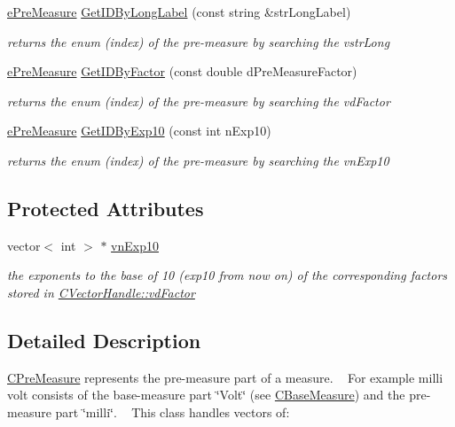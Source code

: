 \begin{DoxyCompactItemize}
\hyperlink{PreMeasure_8h_a6c81167b8d4c2badde42f81cb7214620}{e\+Pre\+Measure} \hyperlink{classCPreMeasure_a5c47dca5a6bc34def68e6a2c7b4c5caa}{Get\+I\+D\+By\+Long\+Label} (const string \&str\+Long\+Label)
\begin{DoxyCompactList}\small\item\em returns the enum (index) of the pre-\/measure by searching the vstr\+Long \end{DoxyCompactList}\item 
\hyperlink{PreMeasure_8h_a6c81167b8d4c2badde42f81cb7214620}{e\+Pre\+Measure} \hyperlink{classCPreMeasure_a90984e3bfb9676fca033289504d10219}{Get\+I\+D\+By\+Factor} (const double d\+Pre\+Measure\+Factor)
\begin{DoxyCompactList}\small\item\em returns the enum (index) of the pre-\/measure by searching the vd\+Factor \end{DoxyCompactList}\item 
\hyperlink{PreMeasure_8h_a6c81167b8d4c2badde42f81cb7214620}{e\+Pre\+Measure} \hyperlink{classCPreMeasure_a4f198103711ef15bac65a5011f32923e}{Get\+I\+D\+By\+Exp10} (const int n\+Exp10)
\begin{DoxyCompactList}\small\item\em returns the enum (index) of the pre-\/measure by searching the vn\+Exp10 \end{DoxyCompactList}\end{DoxyCompactItemize}
\subsection*{Protected Attributes}
\begin{DoxyCompactItemize}
\item 
vector$<$ int $>$ $\ast$ \hyperlink{classCPreMeasure_a2c50eadae55427f0d77a013b3fab0fdb}{vn\+Exp10}
\begin{DoxyCompactList}\small\item\em the exponents to the base of 10 (exp10 from now on) of the corresponding factors stored in \hyperlink{classCVectorHandle_af8f8b2e0da8363e695872ca85f33364e}{C\+Vector\+Handle\+::vd\+Factor} \end{DoxyCompactList}\end{DoxyCompactItemize}


\subsection{Detailed Description}
\hyperlink{classCPreMeasure}{C\+Pre\+Measure} represents the pre-\/measure part of a measure. ~\newline
 For example milli volt consists of the base-\/measure part \char`\"{}\+Volt\char`\"{} (see \hyperlink{classCBaseMeasure}{C\+Base\+Measure}) and the pre-\/measure part \char`\"{}milli\char`\"{}. ~\newline
 This class handles vectors of\+: 


